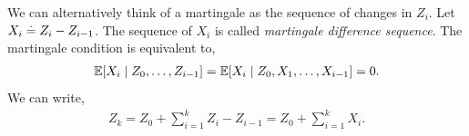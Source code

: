 We can alternatively think of a martingale as the sequence of changes in $Z_i$. Let $X_i \overset{.}{=} Z_i - Z_{i-1}$. The sequence of $X_i$ is called \emph{martingale difference sequence}. The martingale condition is equivalent to, \begin{align}
    \E{X_i \mid Z_0, \dots, Z_{i-1}} = \E{X_i \mid Z_0, X_1, \dots, X_{i-1}} = 0.
\end{align} We can write, \begin{align}
    Z_k = Z_0 + \sum_{i=1}^k Z_i - Z_{i-1} = Z_0 + \sum_{i=1}^k X_i.
\end{align}